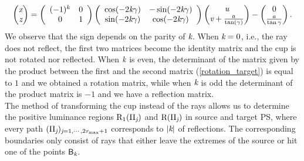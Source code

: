 \begin{equation} \label{rotation_target}\begin{pmatrix} \textit{x}\\ \textit{z}
\end{pmatrix} = \left(\begin{array}{cc}(-1)^k & 0  \\ 0 & 1\end{array}\right)
\left(\begin{array}{cc}\cos(-2\textit{k}\gamma) & -\sin(-2\textit{k}\gamma) \\\sin(-2\textit{k}\gamma) & \cos(-2\textit{k}\gamma)\end{array}\right)\begin{pmatrix} \textit{u} \\
 \textit{v}+\frac{a}{\tan(\gamma)}\end{pmatrix}-\begin{pmatrix}0 \\ \frac{a}{\tan\gamma}\end{pmatrix}.
\end{equation} We observe that the sign depends on the parity of $\textit{k}$. When $\textit{k}=0$, i.e., the ray does not reflect, the first two matrices become the identity matrix and the cup is not rotated nor reflected. When $\textit{k}$ is even, the determinant of the matrix given by the product between the first and the second matrix (\ref{rotation_target}) is equal to $1$ and we obtained a rotation matrix, while when $\textit{k}$ is odd the determinant of the product matrix is $-1$ and we have a reflection matrix.
\\ \indent
The method of transforming the cup instead of the rays allows us to determine the positive luminance regions $\mbox{$\textup{R}$}_1(\Pi_{\textit{j}})$ and $\mbox{$\textup{R}$}(\Pi_{\textit{j}})$ in source and target PS, where every path $(\Pi_{\textit{j}})_{\textit{j}=1, \cdots, 2\textit{r}_{\textrm{max}}+1}$ corresponds to $|\textit{k}|$ of reflections. The corresponding boundaries only consist of rays that either leave the extremes of the source or hit one of the points $\textsf{B}_{\textit{k}}$. 



